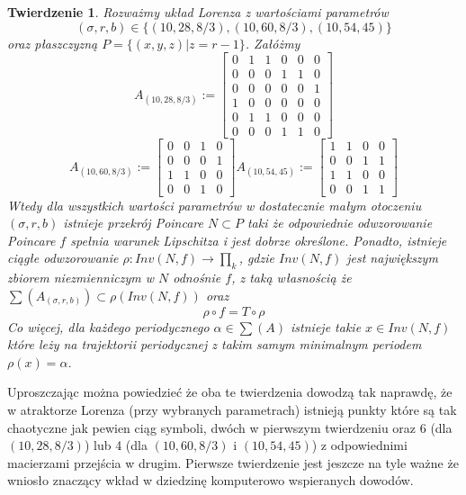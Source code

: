 \documentclass[12pt]{report}
\newtheorem{theorem}{Twierdzenie}
\begin{document}
	\begin{theorem}
		Rozważmy układ Lorenza z wartościami parametrów
			\[ (\sigma, r, b) \in \{(10, 28, 8/3), (10, 60, 8/3), (10, 54, 45)\} \]
		oraz płaszczyzną $P = \{(x, y, z) | z = r - 1\}$. Załóżmy
			\[ A_{(10,28,8/3)} := \begin{bmatrix}
									0 & 1 & 1 & 0 & 0 & 0 \\
									0 & 0 & 0 & 1 & 1 & 0 \\
									0 & 0 & 0 & 0 & 0 & 1 \\
									1 & 0 & 0 & 0 & 0 & 0 \\
									0 & 1 & 1 & 0 & 0 & 0 \\
									0 & 0 & 0 & 1 & 1 & 0
								\end{bmatrix}
			\]
			\[
			   A_{(10,60,8/3)} := \begin{bmatrix}
			   						0 & 0 & 1 & 0 \\
			   						0 & 0 & 0 & 1 \\
			   						1 & 1 & 0 & 0 \\
			   						0 & 0 & 1 & 0
			   					\end{bmatrix}
			   A_{(10,54,45)} := \begin{bmatrix}
			   						1 & 1 & 0 & 0 \\
			   						0 & 0 & 1 & 1 \\
			   						1 & 1 & 0 & 0 \\
			   						0 & 0 & 1 & 1
			   					\end{bmatrix}
			\]
		Wtedy dla wszystkich wartości parametrów w dostatecznie małym otoczeniu $(\sigma, r, b)$ istnieje przekrój Poincare $N \subset P$ taki że odpowiednie odwzorowanie Poincare $f$ spełnia warunek Lipschitza i jest dobrze określone. Ponadto, istnieje ciągłe odwzorowanie $\rho : Inv(N, f) \to \prod_k$, gdzie $Inv(N, f)$ jest największym zbiorem niezmienniczym w $N$ odnośnie $f$, z taką własnością że $\sum (A_{(\sigma, r, b)}) \subset \rho (Inv(N, f))$ oraz
			\[ \rho \circ f = T \circ \rho \]
		Co więcej, dla każdego periodycznego $\alpha \in \sum (A)$ istnieje takie $x \in Inv(N, f)$ które leży na trajektorii periodycznej z takim samym minimalnym periodem $\rho(x) = \alpha$. \cite{MMS}
	\end{theorem}
	\par Uproszczając można powiedzieć że oba te twierdzenia dowodzą tak naprawdę, że w atraktorze Lorenza (przy wybranych parametrach) istnieją punkty które są tak chaotyczne jak pewien ciąg symboli, dwóch w pierwszym twierdzeniu oraz 6 (dla $(10, 28, 8/3)$) lub 4 (dla $(10, 60, 8/3)$ i $(10, 54, 45)$) z odpowiednimi macierzami przejścia w drugim. Pierwsze twierdzenie jest jeszcze na tyle ważne że wniosło znaczący wkład w dziedzinę komputerowo wspieranych dowodów.
\end{document}
